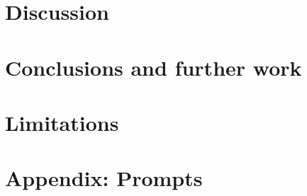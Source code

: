\documentclass[11pt]{article}
\begin{document}
\section{Discussion}


\section{Conclusions and further work}



\section{Limitations}




 



\appendix

\section{Appendix: Prompts}
\label{sec:appendix}
\end{document}
